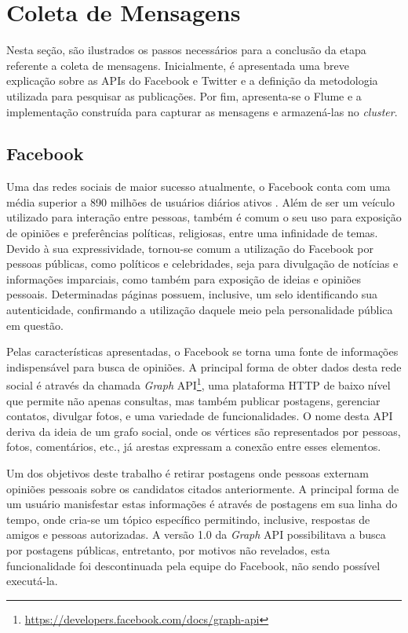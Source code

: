 \section{Coleta de Mensagens}
\label{sec:coleta-imp}

Nesta seção, são ilustrados os passos necessários para a conclusão da etapa referente a coleta de mensagens. Inicialmente, é apresentada uma breve explicação sobre as APIs do Facebook e Twitter e a definição da metodologia utilizada para pesquisar as publicações. Por fim, apresenta-se o Flume e a implementação construída para capturar as mensagens e armazená-las no \textit{cluster}.

\subsection{Facebook}

Uma das redes sociais de maior sucesso atualmente, o Facebook conta com uma média superior a 890 milhões de usuários diários ativos \cite{facebook-doc}. Além de ser um veículo utilizado para interação entre pessoas, também é comum o seu uso para exposição de opiniões e preferências políticas, religiosas, entre uma infinidade de temas. Devido à sua expressividade, tornou-se comum a utilização do Facebook por pessoas públicas, como políticos e celebridades, seja para divulgação de notícias e informações imparciais, como também para exposição de ideias e opiniões pessoais. Determinadas páginas possuem, inclusive, um selo identificando sua autenticidade, confirmando a utilização daquele meio pela personalidade pública em questão.

Pelas características apresentadas, o Facebook se torna uma fonte de informações indispensável para busca de opiniões. A principal forma de obter dados desta rede social é através da chamada \textit{Graph} API\footnote{\url{https://developers.facebook.com/docs/graph-api}}, uma plataforma HTTP de baixo nível que permite não apenas consultas, mas também publicar postagens, gerenciar contatos, divulgar fotos, e uma variedade de funcionalidades. O nome desta API deriva da ideia de um grafo social, onde os vértices são representados por pessoas, fotos, comentários, etc., já arestas expressam a conexão entre esses elementos.

Um dos objetivos deste trabalho é retirar postagens onde pessoas externam opiniões pessoais sobre os candidatos citados anteriormente. A principal forma de um usuário manisfestar estas informações é através de postagens em sua linha do tempo, onde cria-se um tópico específico permitindo, inclusive, respostas de amigos e pessoas autorizadas. A versão 1.0 da \textit{Graph} API possibilitava a busca por postagens públicas, entretanto, por motivos não revelados, esta funcionalidade foi descontinuada pela equipe do Facebook, não sendo possível executá-la.

